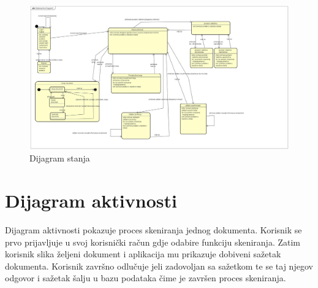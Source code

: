 			\begin{figure}[H]
				\includegraphics[width=\linewidth]{./dijagrami/Dijagram_stanja.jpg}
				\caption{Dijagram stanja}
				\label{fig:Class}
			\end{figure}
			
			\eject 
		
	\section{Dijagram aktivnosti}
	
	
	
	Dijagram aktivnosti pokazuje proces skeniranja jednog dokumenta.
		Korisnik se prvo prijavljuje u svoj korisnički račun gdje
		odabire funkciju skeniranja. Zatim korisnik slika željeni dokument i aplikacija mu prikazuje dobiveni sažetak dokumenta. 
		Korisnik završno odlučuje jeli zadovoljan sa sažetkom te se taj njegov odgovor i sažetak šalju u bazu podataka čime je završen proces skeniranja.
	
